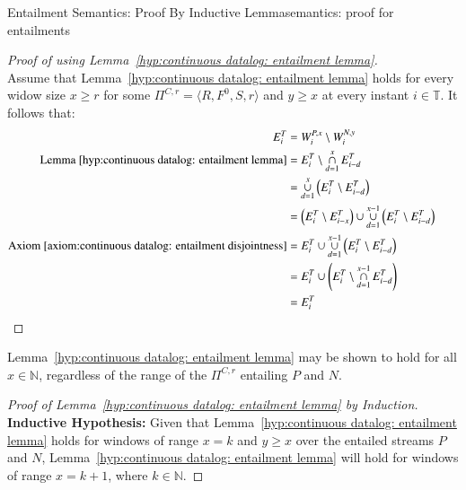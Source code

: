 \begin{nestedsection}{Entailment Semantics: Proof By Inductive Lemma}{semantics: proof for entailments}
	\begin{proof}[Proof of  using Lemma~\ref{hyp:continuous datalog: entailment lemma}]\hfill\\
		Assume that Lemma~\ref{hyp:continuous datalog: entailment lemma} holds for every widow size ${x \geq r}$ for some ${\Pi^{C,r} = \langle R, F^0, S, r \rangle}$ and ${y \geq x}$ at every instant ${i \in \mathbb{T}}$.
		It follows that:
		\begin{align*}
			E^T_{i} & = W^{P,x}_{i} \setminus W^{N,y}_{i} \\
			\text{Lemma~\ref{hyp:continuous datalog: entailment lemma}} & = E^T_{i} \setminus \mathop{\cap}^{x}_{d=1} E^T_{i-d} \\
			& = \mathop{\cup}^{x}_{d=1} \left( E^T_{i} \setminus E^T_{i-d} \right) \\
			& = \left( E^T_{i} \setminus E^T_{i-x} \right) \cup \mathop{\cup}^{x-1}_{d=1} \left( E^T_{i} \setminus E^T_{i-d} \right) \\
			\text{Axiom~\ref{axiom:continuous datalog: entailment disjointness}} & = E^T_{i} \cup \mathop{\cup}^{x-1}_{d=1} \left( E^T_{i} \setminus E^T_{i-d} \right) \\
			& = E^T_{i} \cup \left( E^T_{i} \setminus \mathop{\cap}^{x-1}_{d=1} E^T_{i-d} \right) \\
			& = E^T_{i} && \qedhere
		\end{align*}
	\end{proof}

	Lemma~\ref{hyp:continuous datalog: entailment lemma} may be shown to hold for all ${x \in \mathbb{N}}$, regardless of the range of the ${\Pi^{C,r}}$ entailing $P$ and $N$.

	\begin{proof}[Proof of Lemma~\ref{hyp:continuous datalog: entailment lemma} by Induction]
		\textbf{Inductive Hypothesis:} Given that Lemma~\ref{hyp:continuous datalog: entailment lemma} holds for windows of range ${x = k}$ and ${y \geq x}$ over the entailed streams $P$ and $N$, Lemma~\ref{hyp:continuous datalog: entailment lemma} will hold for windows of range ${x = k + 1}$, where ${k \in \mathbb{N}}$.


\end{proof}
\end{nestedsection}
